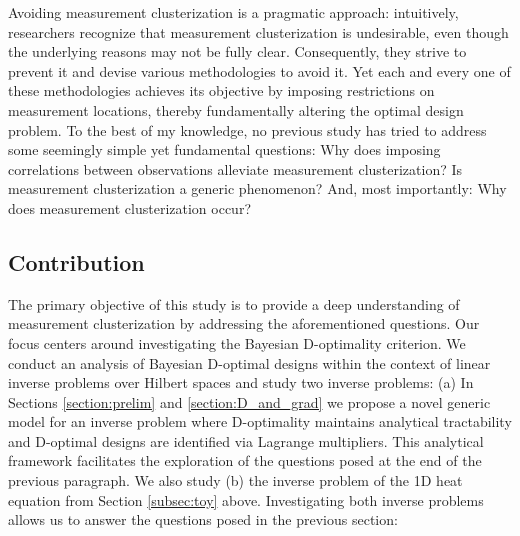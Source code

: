 Avoiding measurement clusterization is a pragmatic approach:
intuitively, researchers recognize that measurement clusterization is
undesirable, even though the underlying reasons may not be fully
clear. Consequently, they strive to prevent it and devise various
methodologies to avoid it. Yet each and every one of these
methodologies achieves its objective by imposing restrictions on
measurement locations, thereby fundamentally altering the optimal
design problem. To the best of my knowledge, no previous study has
tried to address some seemingly simple yet fundamental questions:
%
Why does imposing correlations between observations alleviate
measurement clusterization?
%
Is measurement clusterization a generic phenomenon? 
%
And, most importantly: Why does measurement clusterization occur?
%
%


\subsection{Contribution}
The primary objective of this study is to provide a deep understanding
of measurement clusterization by addressing the aforementioned
questions. Our focus centers around investigating the Bayesian
D-optimality criterion. We conduct an analysis of Bayesian D-optimal
designs within the context of linear inverse problems over Hilbert
spaces and study two inverse problems: (a) In Sections
\ref{section:prelim} and \ref{section:D_and_grad} we propose a novel
generic model for an inverse problem where D-optimality maintains
analytical tractability and D-optimal designs are identified via
Lagrange multipliers. This analytical framework facilitates the
exploration of the questions posed at the end of the previous
paragraph. We also study (b) the inverse problem of the 1D heat
equation from Section \ref{subsec:toy} above. Investigating both
inverse problems allows us to answer the questions posed in the
previous section:

